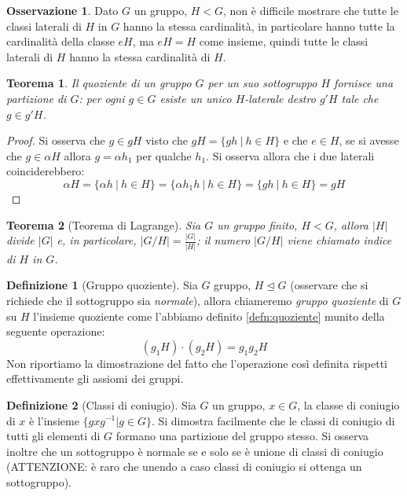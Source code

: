 \documentclass[11pt]{article}
\theoremstyle{plain}
\newtheorem{thm}{Teorema}[section]
\theoremstyle{definition}
\newtheorem{defn}{Definizione}[section]
\newtheorem*{rem}{Osservazione}
\theoremstyle{remark}
\begin{document}
\begin{rem}
	Dato $G$ un gruppo, $H<G$, non è difficile mostrare che tutte le classi laterali di $H$ in $G$ hanno la stessa cardinalità, in particolare hanno tutte la cardinalità della classe $eH$, ma $eH=H$ come insieme, quindi tutte le classi laterali di $H$ hanno la stessa cardinalità di $H$.
\end{rem}


\begin{thm}
	Il quoziente di un gruppo $G$ per un suo sottogruppo $H$ fornisce una partizione di $G$: per ogni $g\in G$ esiste un unico $H$-laterale destro $g'H$ tale che $g\in g'H$. 
\end{thm}
\begin{proof}
	Si osserva che $g\in gH$ visto che $gH=\{gh\ |\ h\in H\}$ e che $e\in H$, se si avesse che $g\in \alpha H$ allora $g=\alpha h_1$ per qualche $h_1$. Si osserva allora che i due laterali coinciderebbero:
	\[
		\alpha H=\{ \alpha h\ |\ h\in H\} = \{ \alpha h_1 h\ |\ h\in H \} = \{ gh\ |\ h\in H\} = gH
	\]
\end{proof}

\begin{thm}[Teorema di Lagrange]
	Sia $G$ un gruppo finito, $H<G$, allora $|H|$ divide $|G|$ e, in particolare, $\displaystyle |G/H|=\frac{|G|}{|H|}$; il numero $|G/H|$ viene chiamato \textit{indice} di $H$ in $G$.
\end{thm}


\begin{defn}[Gruppo quoziente]
	Sia $G$ gruppo, $H\trianglelefteq G$ (osservare che si richiede che il sottogruppo sia \textit{normale}), allora chiameremo \textit{gruppo quoziente} di $G$ su $H$ l'insieme quoziente come l'abbiamo definito \eqref{defn:quoziente} munito della seguente operazione:
	\[
		(g_1H)\cdot(g_2H)=g_1g_2H
	\]
	Non riportiamo la dimostrazione del fatto che l'operazione così definita rispetti effettivamente gli assiomi dei gruppi.
\end{defn}

\begin{defn}[Classi di coniugio]
Sia $G$ un gruppo, $x \in G$, la classe di coniugio di $x$ è l'insieme $\{ gxg^{-1} | g\in G \}$. Si dimostra facilmente che le classi di coniugio di tutti gli elementi di $G$ formano una partizione del gruppo stesso. Si osserva inoltre che un sottogruppo è normale se e solo se è unione di classi di coniugio (ATTENZIONE: è raro che unendo a caso classi di coniugio si ottenga un sottogruppo).
\end{defn}
\end{document}
